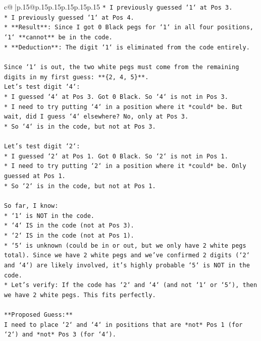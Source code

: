 \documentclass{article}
\begin{document}
{\begin{supertabular}{c@{$\;$}|p{.15\linewidth}@{}p{.15\linewidth}p{.15\linewidth}p{.15\linewidth}p{.15\linewidth}p{.15\linewidth}}
{{{\texttt{*   I previously guessed `1` at Pos 3.} \\
\texttt{*   I previously guessed `1` at Pos 4.} \\
\texttt{*   **Result**: Since I got 0 Black pegs for `1` in all four positions, `1` **cannot** be in the code.} \\
\texttt{*   **Deduction**: The digit `1` is eliminated from the code entirely.} \\
\\ 
\texttt{Since `1` is out, the two white pegs must come from the remaining digits in my first guess: **\{2, 4, 5\}**.} \\
\texttt{Let's test digit `4`:} \\
\texttt{*   I guessed `4` at Pos 3. Got 0 Black. So `4` is not in Pos 3.} \\
\texttt{*   I need to try putting `4` in a position where it *could* be. But wait, did I guess `4` elsewhere? No, only at Pos 3.} \\
\texttt{*   So `4` is in the code, but not at Pos 3.} \\
\\ 
\texttt{Let's test digit `2`:} \\
\texttt{*   I guessed `2` at Pos 1. Got 0 Black. So `2` is not in Pos 1.} \\
\texttt{*   I need to try putting `2` in a position where it *could* be. Only guessed at Pos 1.} \\
\texttt{*   So `2` is in the code, but not at Pos 1.} \\
\\ 
\texttt{So far, I know:} \\
\texttt{*   `1` is NOT in the code.} \\
\texttt{*   `4` IS in the code (not at Pos 3).} \\
\texttt{*   `2` IS in the code (not at Pos 1).} \\
\texttt{*   `5` is unknown (could be in or out, but we only have 2 white pegs total). Since we have 2 white pegs and we've confirmed 2 digits (`2` and `4`) are likely involved, it's highly probable `5` is NOT in the code.} \\
\texttt{*   Let's verify: If the code has `2` and `4` (and not `1` or `5`), then we have 2 white pegs. This fits perfectly.} \\
\\ 
\texttt{**Proposed Guess:**} \\
\texttt{I need to place `2` and `4` in positions that are *not* Pos 1 (for `2`) and *not* Pos 3 (for `4`).} \\
}}}
\end{supertabular}}
\end{document}
